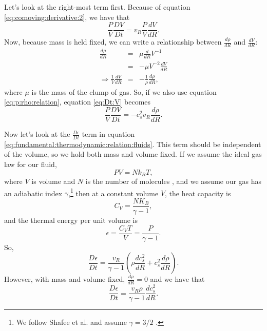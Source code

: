 \documentclass[]{article}
\newcommand{\dR}[1]{\frac{d #1}{dR}}
\newcommand{\ddR}{\frac{d}{dR}}
\newcommand{\Dt}[1]{\frac{D #1}{Dt}}
\begin{document}
Let's look at the right-most term first. Because of equation
\eqref{eq:comoving:derivative:2}, we have that
\begin{equation}
  \label{eq:Dt:V}
  \frac{P}{V}\Dt{V} = v_R\frac{P}{V}\dR{V}.
\end{equation}
Now, because mass is held fixed, we can write a relationship between
$\dR{\rho}$ and $\dR{V}$:
\begin{eqnarray}
  \dR{\rho} &=& \mu\ddR{V^{-1}}\nonumber\\
  &=& -\mu V^{-2} \dR{V}\nonumber\\
  \label{eq:d:rho:d:R}
  \Rightarrow \frac{1}{V}\dR{V} &=& - \frac{1}{\rho}\dR{\rho},
\end{eqnarray}
where $\mu$ is the mass of the clump of gas. So, if we also use
equation \eqref{eq:p:rho:relation}, equation \eqref{eq:Dt:V} becomes
\begin{equation}
  \label{eq:eq:Dt:V:final}
  \frac{P}{V} \Dt{V} = - c_s^2 v_R \dR{\rho}.
\end{equation}

Now let's look at the $\Dt{\epsilon}$ term in equation
\eqref{eq:fundamental:thermodynamic:relation:fluids}. This term should
be independent of the volume, so we hold both mass and volume
fixed. If we assume the ideal gas law for our fluid,
\begin{equation}
  \label{eq:idea:gas:law}
  PV = N k_B T,
\end{equation}
where $V$ is volume and $N$ is the number of molecules
\cite{Schroeder}, and we assume our gas has an adiabatic index
$\gamma$,\footnote{We follow Shafee et al. and assume $\gamma=3/2$
  \cite{Shafee08}.} then at a constant volume $V$, the heat capacity
is
\begin{equation}
  \label{eq:heat:capacity}
  C_V = \frac{N K_B}{\gamma - 1},
\end{equation}
and the thermal energy per unit volume is
\begin{equation}
  \label{eq:thermal:energy:per:unit:volume}
  \epsilon = \frac{C_V T}{V} = \frac{P}{\gamma - 1}.
\end{equation}
So,
\begin{equation}
  \label{eq:derivative:energy:per:unit:volume}
  \Dt{\epsilon} = \frac{v_R}{\gamma - 1} \left(\rho\dR{c_s^2} + c_s^2 \dR{\rho}\right).
\end{equation}
However, with mass and volume fixed, $\dR{\rho} = 0$ and we have that
\begin{equation}
  \label{eq:derivative:energy:per:unit:volume:final}
  \Dt{\epsilon} = \frac{v_R\rho}{\gamma - 1}\dR{c_s^2}.
\end{equation}
\end{document}
